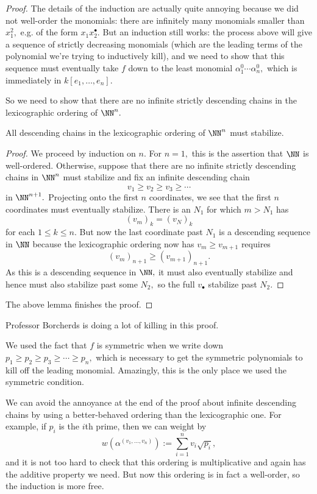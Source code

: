 \documentclass[../notes.tex]{subfiles}
\begin{document}
\begin{proof}
	The details of the induction are actually quite annoying because we did not well-order the monomials: there are infinitely many monomials smaller than $x_1^2,$ e.g. of the form $x_1x_2^\bullet.$ But an induction still works: the process above will give a sequence of strictly decreasing monomials (which are the leading terms of the polynomial we're trying to inductively kill), and we need to show that this sequence must eventually take $f$ down to the least monomial $\alpha_1^0\cdots\alpha_n^0,$ which is immediately in $k[e_1,\ldots,e_n].$
	
	So we need to show that there are no infinite strictly descending chains in the lexicographic ordering of $\NN^n.$
	\begin{lemma}
		All descending chains in the lexicographic ordering of $\NN^n$ must stabilize.
	\end{lemma}
	\begin{proof}
		We proceed by induction on $n.$ For $n=1,$ this is the assertion that $\NN$ is well-ordered. Otherwise, suppose that there are no infinite strictly descending chains in $\NN^n$ must stabilize and fix an infinite descending chain
		\[v_1\ge v_2\ge v_3\ge\cdots\]
		in $\NN^{n+1}.$ Projecting onto the first $n$ coordinates, we see that the first $n$ coordinates must eventually stabilize. There is an $N_1$ for which $m>N_1$ has
		\[(v_m)_k=(v_N)_k\]
		for each $1\le k\le n.$ But now the last coordinate past $N_1$ is a descending sequence in $\NN$ because the lexicographic ordering now has $v_m\ge v_{m+1}$ requires
		\[(v_m)_{n+1}\ge(v_{m+1})_{n+1}.\]
		As this is a descending sequence in $\NN,$ it must also eventually stabilize and hence must also stabilize past some $N_2,$ so the full $v_\bullet$ stabilize past $N_2.$
	\end{proof}
	The above lemma finishes the proof.
\end{proof}
\begin{remark}
	Professor Borcherds is doing a lot of killing in this proof.
\end{remark}
\begin{remark}
	We used the fact that $f$ is symmetric when we write down $p_1\ge p_2\ge p_3\ge\cdots\ge p_n,$ which is necessary to get the symmetric polynomials to kill off the leading monomial. Amazingly, this is the only place we used the symmetric condition.
\end{remark}
\begin{remark}[Nir] \label{rem:betterord}
	We can avoid the annoyance at the end of the proof about infinite descending chains by using a better-behaved ordering than the lexicographic one. For example, if $p_i$ is the $i$th prime, then we can weight by
	\[w\left(\alpha^{(v_1,\ldots,v_n)}\right):=\sum_{i=1}^nv_i\sqrt{p_i},\]
	and it is not too hard to check that this ordering is multiplicative and again has the additive property we need. But now this ordering is in fact a well-order, so the induction is more free.
\end{remark}
\end{document}
